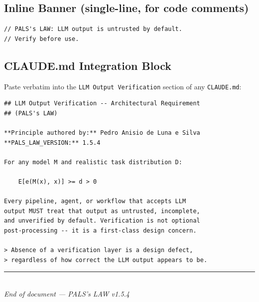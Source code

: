 \documentclass[11pt,a4paper]{article}
\begin{document}
\subsection{Inline Banner (single-line, for code comments)}

\begin{lstlisting}[language={}]
// PALS's LAW: LLM output is untrusted by default.
// Verify before use.
\end{lstlisting}

\subsection{CLAUDE.md Integration Block}

Paste verbatim into the \texttt{LLM Output Verification} section of any \texttt{CLAUDE.md}:

\begin{lstlisting}[language={}]
## LLM Output Verification -- Architectural Requirement
## (PALS's LAW)

**Principle authored by:** Pedro Anisio de Luna e Silva
**PALS_LAW_VERSION:** 1.5.4

For any model M and realistic task distribution D:

    E[e(M(x), x)] >= d > 0

Every pipeline, agent, or workflow that accepts LLM
output MUST treat that output as untrusted, incomplete,
and unverified by default. Verification is not optional
post-processing -- it is a first-class design concern.

> Absence of a verification layer is a design defect,
> regardless of how correct the LLM output appears to be.
\end{lstlisting}

\vspace{2em}
\begin{center}
\rule{0.5\textwidth}{0.4pt}\\[0.5em]
\emph{End of document --- PALS's LAW v1.5.4}
\end{center}
\end{document}
